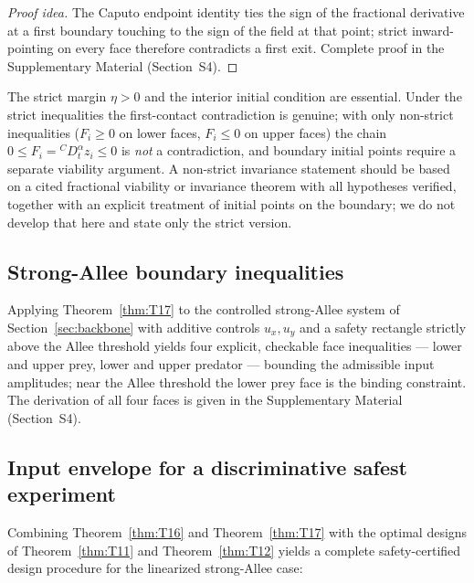 \begin{proof}[Proof idea]
The Caputo endpoint identity ties the sign of the fractional derivative at a first boundary touching to the sign of the field at that point; strict inward-pointing on every face therefore contradicts a first exit. Complete proof in the Supplementary Material (Section~S4).
\end{proof}

\begin{remark}
\label{rem:strict_rect}
The strict margin \(\eta > 0\) and the interior initial condition are essential. Under the strict inequalities the first-contact contradiction is genuine; with only non-strict inequalities (\(F_i \ge 0\) on lower faces, \(F_i \le 0\) on upper faces) the chain \(0 \le F_i = {}^C D_t^\alpha z_i \le 0\) is \emph{not} a contradiction, and boundary initial points require a separate viability argument. A non-strict invariance statement should be based on a cited fractional viability or invariance theorem with all hypotheses verified, together with an explicit treatment of initial points on the boundary; we do not develop that here and state only the strict version.
\end{remark}

\subsection{Strong-Allee boundary inequalities}

Applying Theorem~\ref{thm:T17} to the controlled strong-Allee system of Section~\ref{sec:backbone} with additive controls $u_x,u_y$ and a safety rectangle strictly above the Allee threshold yields four explicit, checkable face inequalities --- lower and upper prey, lower and upper predator --- bounding the admissible input amplitudes; near the Allee threshold the lower prey face is the binding constraint. The derivation of all four faces is given in the Supplementary Material (Section~S4).

\subsection{Input envelope for a discriminative safest experiment}

Combining Theorem~\ref{thm:T16} and Theorem~\ref{thm:T17} with the optimal designs of Theorem~\ref{thm:T11} and Theorem~\ref{thm:T12} yields a complete safety-certified design procedure for the linearized strong-Allee case:

